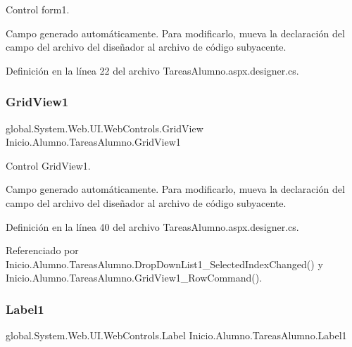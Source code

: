 Control form1. 

Campo generado automáticamente. Para modificarlo, mueva la declaración del campo del archivo del diseñador al archivo de código subyacente. 

Definición en la línea 22 del archivo Tareas\+Alumno.\+aspx.\+designer.\+cs.

\mbox{\label{classInicio_1_1Alumno_1_1TareasAlumno_a00d31bb5bb72e919f1b1eddb71375eac}} 
\subsubsection{\texorpdfstring{GridView1}{GridView1}}
{\footnotesize\ttfamily global.\+System.\+Web.\+U\+I.\+Web\+Controls.\+Grid\+View Inicio.\+Alumno.\+Tareas\+Alumno.\+Grid\+View1\hspace{0.3cm}{\ttfamily [protected]}}



Control Grid\+View1. 

Campo generado automáticamente. Para modificarlo, mueva la declaración del campo del archivo del diseñador al archivo de código subyacente. 

Definición en la línea 40 del archivo Tareas\+Alumno.\+aspx.\+designer.\+cs.



Referenciado por Inicio.\+Alumno.\+Tareas\+Alumno.\+Drop\+Down\+List1\+\_\+\+Selected\+Index\+Changed() y Inicio.\+Alumno.\+Tareas\+Alumno.\+Grid\+View1\+\_\+\+Row\+Command().

\mbox{\label{classInicio_1_1Alumno_1_1TareasAlumno_aa472c0d32d562f35fc34c59867581297}} 
\subsubsection{\texorpdfstring{Label1}{Label1}}
{\footnotesize\ttfamily global.\+System.\+Web.\+U\+I.\+Web\+Controls.\+Label Inicio.\+Alumno.\+Tareas\+Alumno.\+Label1\hspace{0.3cm}{\ttfamily [protected]}}



